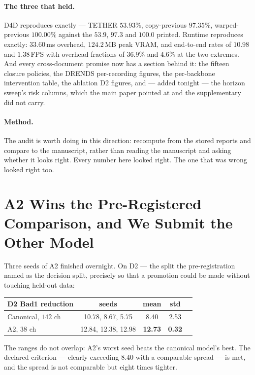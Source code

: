 \documentclass[11pt,a4paper]{article}
\begin{document}
\paragraph{The three that held.} D4D reproduces exactly --- TETHER
$53.93\%$, copy-previous $97.35\%$, warped-previous $100.00\%$ against
the $53.9$, $97.3$ and $100.0$ printed. Runtime reproduces exactly:
$33.60$\,ms overhead, $124.2$\,MB peak VRAM, and end-to-end rates of
$10.98$ and $1.38$\,FPS with overhead fractions of $36.9\%$ and $4.6\%$
at the two extremes. And every cross-document promise now has a section
behind it: the fifteen closure policies, the DRENDS per-recording
figures, the per-backbone intervention table, the ablation D2 figures,
and --- added tonight --- the horizon sweep's risk columns, which the
main paper pointed at and the supplementary did not carry.

\paragraph{Method.} The audit is worth doing in this direction:
recompute from the stored reports and compare to the manuscript, rather
than reading the manuscript and asking whether it looks right. Every
number here looked right. The one that was wrong looked right too.



\section*{A2 Wins the Pre-Registered Comparison, and We Submit the Other Model}

Three seeds of A2 finished overnight. On D2 --- the split the
pre-registration named as the decision split, precisely so that a
promotion could be made without touching held-out data:

\begin{center}
\footnotesize
\begin{tabular}{@{}lcccc@{}}
\toprule
D2 Bad1 reduction & seeds & mean & std \\
\midrule
Canonical, $142$ ch & 10.78, 8.67, 5.75 & 8.40 & 2.53 \\
A2, $38$ ch & 12.84, 12.38, 12.98 & \textbf{12.73} & \textbf{0.32} \\
\bottomrule
\end{tabular}
\end{center}

The ranges do not overlap: A2's worst seed beats the canonical model's
best. The declared criterion --- clearly exceeding $8.40$ with a
comparable spread --- is met, and the spread is not comparable but eight
times tighter.
\end{document}
